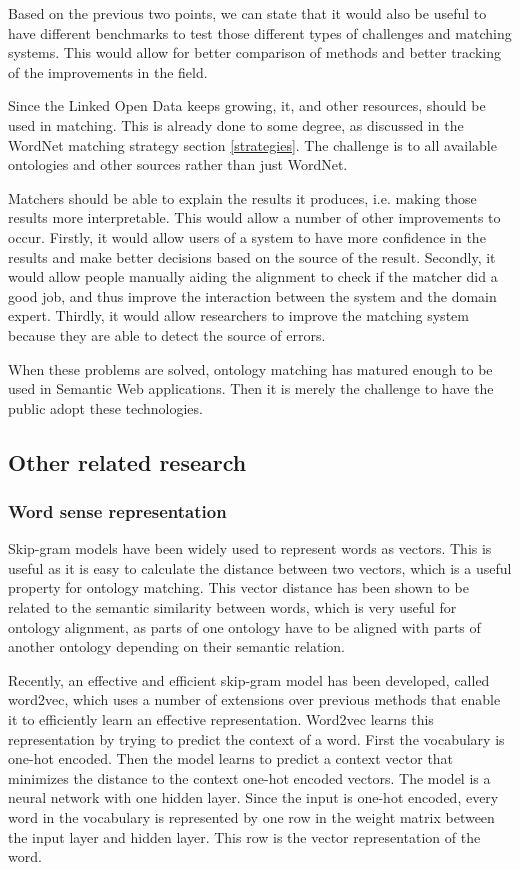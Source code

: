 \documentclass{article}
\begin{document}
 Based on the previous two points, we can state that it would also be useful to have different benchmarks to test those different types of challenges and matching systems. This would allow for better comparison of methods and better tracking of the improvements in the field.
 
 Since the Linked Open Data keeps growing, it, and other resources, should be used in matching. This is already done to some degree, as discussed in the WordNet matching strategy section \ref{strategies}. The challenge is to all available ontologies and other sources rather than just WordNet.
 
 Matchers should be able to explain the results it produces, i.e. making those results more interpretable. This would allow a number of other improvements to occur. Firstly, it would allow users of a system to have more confidence in the results and make better decisions based on the source of the result. Secondly, it would allow people manually aiding the alignment to check if the matcher did a good job, and thus improve the interaction between the system and the domain expert. Thirdly, it would allow researchers to improve the matching system because they are able to detect the source of errors.
 
 When these problems are solved, ontology matching has matured enough to be used in Semantic Web applications. Then it is merely the challenge to have the public adopt these technologies.
 
 \subsection{Other related research}
 \subsubsection{Word sense representation}
 Skip-gram models have been widely used to represent words as vectors. This is useful as it is easy to calculate the distance between two vectors, which is a useful property for ontology matching. This vector distance has been shown to be related to the semantic similarity between words, which is very useful for ontology alignment, as parts of one ontology have to be aligned with parts of another ontology depending on their semantic relation.
 
 Recently, an effective and efficient skip-gram model has been developed, called word2vec, which uses a number of extensions over previous methods that enable it to efficiently learn an effective representation.
 Word2vec learns this representation by trying to predict the context of a word. First the vocabulary is one-hot encoded. Then the model learns to predict a context vector that minimizes the distance to the context one-hot encoded vectors. The model is a neural network with one hidden layer. Since the input is one-hot encoded, every word in the vocabulary is represented by one row in the weight matrix between the input layer and hidden layer. This row is the vector representation of the word.
 
\end{document}
